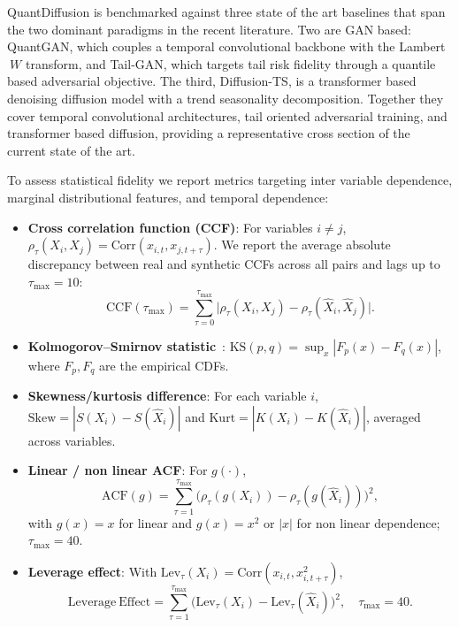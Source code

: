 \documentclass[sigconf,natbib=false]{acmart}
\begin{document}
QuantDiffusion is benchmarked against three state of the art baselines that span the two dominant paradigms in the recent literature. Two are GAN based: QuantGAN, which couples a temporal convolutional backbone with the Lambert$~W$ transform, and Tail-GAN, which targets tail risk fidelity through a quantile based adversarial objective. The third, Diffusion-TS, is a transformer based denoising diffusion model with a trend seasonality decomposition. Together they cover temporal convolutional architectures, tail oriented adversarial training, and transformer based diffusion, providing a representative cross section of the current state of the art.

To assess statistical fidelity we report metrics targeting inter variable dependence, marginal distributional features, and temporal dependence:

\begin{itemize}
    \item \textbf{Cross correlation function (CCF)}: For variables $i \ne j$, $\rho_\tau(X_i, X_j) = \mathrm{Corr}(x_{i,t}, x_{j,t+\tau})$. We report the average absolute discrepancy between real and synthetic CCFs across all pairs and lags up to $\tau_{\max} = 10$:
    \begin{equation}
        \mathrm{CCF}(\tau_{\max}) = \sum_{\tau=0}^{\tau_{\max}}
        \bigl|\rho_\tau(X_i,X_j) - \rho_\tau(\widehat{X}_i,\widehat{X}_j)\bigr|.
    \end{equation}

    \item \textbf{Kolmogorov--Smirnov statistic}~\cite{KS-test}: $\mathrm{KS}(p,q) = \sup_{x} |F_p(x) - F_q(x)|$, where $F_p, F_q$ are the empirical CDFs.
    
    \item \textbf{Skewness/kurtosis difference}: For each variable $i$, $\mathrm{Skew} = |S(X_i) - S(\widehat{X}_i)|$ and $\mathrm{Kurt} = |K(X_i) - K(\widehat{X}_i)|$, averaged across variables.

    \item \textbf{Linear / non linear ACF}: For $g(\cdot)$,
    \begin{equation}
        \mathrm{ACF}(g) = \sum_{\tau=1}^{\tau_{\max}}
        \bigl(\rho_\tau(g(X_i)) - \rho_\tau(g(\widehat{X}_i))\bigr)^2,
    \end{equation}
    with $g(x)=x$ for linear and $g(x)=x^2$ or $|x|$ for non linear dependence; $\tau_{\max} = 40$.

    \item \textbf{Leverage effect}: With $\mathrm{Lev}_\tau(X_i) = \mathrm{Corr}(x_{i,t}, x_{i,t+\tau}^2)$,
    \begin{equation}
        \mathrm{Leverage\ Effect} = \sum_{\tau=1}^{\tau_{\max}}
        \bigl(\mathrm{Lev}_\tau(X_i) - \mathrm{Lev}_\tau(\widehat{X}_i)\bigr)^2, \quad \tau_{\max}=40.
    \end{equation}
\end{itemize}
\end{document}
